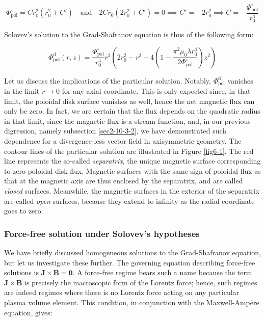 \begin{equation}
    \Phi_\text{pol}^\square=Cr_0^2\left(r_0^2+C'\right)\quad\text{and}\quad2Cr_0(2r_0^2+C')=0\implies C'=-2r_0^2\implies C=-\frac{\Phi_\text{pol}^\square}{r_0^4}
\end{equation}

Solovev's solution to the Grad-Shafranov equation is thus of the following form:

\begin{equation}
    \Phi_\text{pol}^\mathrm{d}(r,z)=\frac{\Phi_\text{pol}^\square}{r_0^4}r^2\left(2r_0^2-r^2+4\left(1-\frac{\pi^2\mu_0\lambda r_0^4}{2\Phi_\text{pol}^\square}\right)z^2\right)
\end{equation}

Let us discuss the implications of the particular solution. Notably, $\Phi_\text{pol}^\mathrm{d}$ vanishes in the limit $r\to0$ for any axial coordinate. This is only expected since, in that limit, the poloidal disk surface vanishes as well, hence the net magnetic flux can only be zero. In fact, we are certain that the flux depends on the quadratic radius in that limit, since the magnetic flux is a stream function, and, in our previous digression, namely subsection \ref{sec2-10-3-2}, we have demonstrated such dependence for a divergence-less vector field in axisymmetric geometry. The contour lines of the particular solution are illustrated in Figure \ref{fig6-1}. The red line represents the so-called \textit{separatrix}, the unique magnetic surface corresponding to zero poloidal disk flux. Magnetic surfaces with the same sign of poloidal flux as that at the magnetic axis are thus enclosed by the separatrix, and are called \textit{closed} surfaces. Meanwhile, the magnetic surfaces in the exterior of the separatrix are called \textit{open} surfaces, because they extend to infinity as the radial coordinate goes to zero.

\subsubsection{Force-free solution under Solovev's hypotheses}

\label{subsec-force-free-sols}

We have briefly discussed homogeneous solutions to the Grad-Shafranov equation, but let us investigate these further. The governing equation describing force-free solutions is $\mathbf{J}\times\mathbf{B}=\mathbf{0}$. A force-free regime bears such a name because the term $\mathbf{J}\times\mathbf{B}$ is precisely the macroscopic form of the Lorentz force; hence, such regimes are indeed regimes where there is no Lorentz force acting on any particular plasma volume element. This condition, in conjunction with the Maxwell-Ampère equation, gives:

